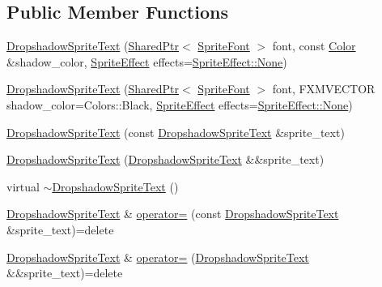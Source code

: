 \subsection*{Public Member Functions}
\begin{DoxyCompactItemize}
\item 
\hyperlink{classmage_1_1_dropshadow_sprite_text_af9580cd770e5dad0b3d5a9299c0a7522}{Dropshadow\+Sprite\+Text} (\hyperlink{namespacemage_a1e01ae66713838a7a67d30e44c67703e}{Shared\+Ptr}$<$ \hyperlink{classmage_1_1_sprite_font}{Sprite\+Font} $>$ font, const \hyperlink{structmage_1_1_color}{Color} \&shadow\+\_\+color, \hyperlink{namespacemage_a9cfe18123066ba4236f548f9de75d881}{Sprite\+Effect} effects=\hyperlink{namespacemage_a9cfe18123066ba4236f548f9de75d881a6adf97f83acf6453d4a6a4b1070f3754}{Sprite\+Effect\+::\+None})
\item 
\hyperlink{classmage_1_1_dropshadow_sprite_text_ad572ec34643bb332ecea712d5dc0f625}{Dropshadow\+Sprite\+Text} (\hyperlink{namespacemage_a1e01ae66713838a7a67d30e44c67703e}{Shared\+Ptr}$<$ \hyperlink{classmage_1_1_sprite_font}{Sprite\+Font} $>$ font, F\+X\+M\+V\+E\+C\+T\+OR shadow\+\_\+color=Colors\+::\+Black, \hyperlink{namespacemage_a9cfe18123066ba4236f548f9de75d881}{Sprite\+Effect} effects=\hyperlink{namespacemage_a9cfe18123066ba4236f548f9de75d881a6adf97f83acf6453d4a6a4b1070f3754}{Sprite\+Effect\+::\+None})
\item 
\hyperlink{classmage_1_1_dropshadow_sprite_text_af0a9422a32ed8962d6c691fe76f44c30}{Dropshadow\+Sprite\+Text} (const \hyperlink{classmage_1_1_dropshadow_sprite_text}{Dropshadow\+Sprite\+Text} \&sprite\+\_\+text)
\item 
\hyperlink{classmage_1_1_dropshadow_sprite_text_a238b873f7b4d818cc3640e8f363f760e}{Dropshadow\+Sprite\+Text} (\hyperlink{classmage_1_1_dropshadow_sprite_text}{Dropshadow\+Sprite\+Text} \&\&sprite\+\_\+text)
\item 
virtual \hyperlink{classmage_1_1_dropshadow_sprite_text_a561b1be59d05bccb680969be792c0e28}{$\sim$\+Dropshadow\+Sprite\+Text} ()
\item 
\hyperlink{classmage_1_1_dropshadow_sprite_text}{Dropshadow\+Sprite\+Text} \& \hyperlink{classmage_1_1_dropshadow_sprite_text_a83846227264396ee5b6ca44304bc404a}{operator=} (const \hyperlink{classmage_1_1_dropshadow_sprite_text}{Dropshadow\+Sprite\+Text} \&sprite\+\_\+text)=delete
\item 
\hyperlink{classmage_1_1_dropshadow_sprite_text}{Dropshadow\+Sprite\+Text} \& \hyperlink{classmage_1_1_dropshadow_sprite_text_aea70f005fd9eae94aee9da27aa54534b}{operator=} (\hyperlink{classmage_1_1_dropshadow_sprite_text}{Dropshadow\+Sprite\+Text} \&\&sprite\+\_\+text)=delete

\end{DoxyCompactItemize}

